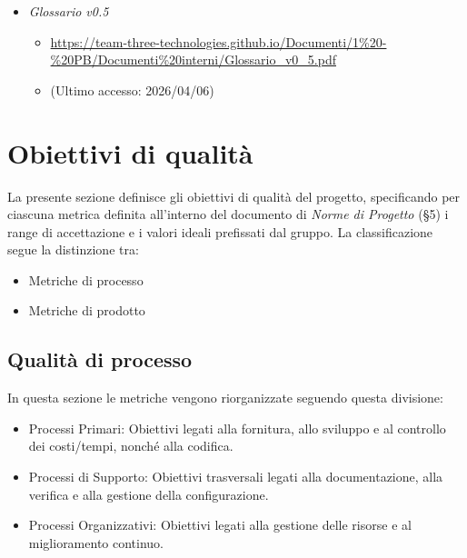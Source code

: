 \documentclass[a4paper,12pt]{article}
\begin{document}
{\begin{itemize}
                    \begin{itemize}
                        \item \url{https://www.math.unipd.it/~tullio/IS-1/2009/Approfondimenti/ISO_12207-1995.pdf}
                        \item[] (Ultimo accesso: 2026/03/03)
                    \end{itemize}
                    \item \textit{Glossario v0.5}
                    \begin{itemize}
                        \item \url{https://team-three-technologies.github.io/Documenti/1%20-%20PB/Documenti%20interni/Glossario_v0_5.pdf}
                        \item[] (Ultimo accesso: 2026/04/06)
                    \end{itemize}
                \end{itemize}
    }

    \newpage

    \section{Obiettivi di qualità}
    La presente sezione definisce gli obiettivi di qualità del progetto, specificando per ciascuna metrica definita all'interno del documento di \textit{Norme di Progetto} (\S5) i range di accettazione e i valori ideali prefissati dal gruppo. La classificazione segue la distinzione tra:
    \begin{itemize}
        \item Metriche di processo
        \item Metriche di prodotto
    \end{itemize}
    
        \subsection{Qualità di processo}
            In questa sezione le metriche vengono riorganizzate seguendo questa divisione: 
            \begin{itemize}
                \item Processi Primari: Obiettivi legati alla fornitura, allo sviluppo e al controllo dei costi/tempi, nonché alla codifica.
                \item Processi di Supporto: Obiettivi trasversali legati alla documentazione, alla verifica e alla gestione della configurazione.
                \item Processi Organizzativi: Obiettivi legati alla gestione delle risorse e al miglioramento continuo.
            \end{itemize}
            
\end{document}
